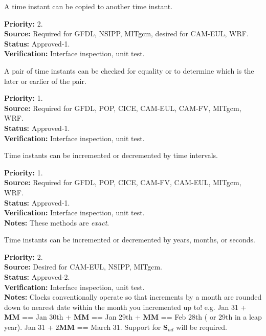A time instant can be copied to another time instant.
\begin{reqlist}
{\bf Priority:} 2. \\
{\bf Source:} Required for GFDL, NSIPP, MITgcm, desired for CAM-EUL, WRF. \\
{\bf Status:} Approved-1. \\
{\bf Verification:} Interface inspection, unit test. 
\end{reqlist}

A pair of time instants can be checked for equality or to determine
which is the later or earlier of the pair.
\begin{reqlist}
{\bf Priority:} 1. \\
{\bf Source:} Required for GFDL, POP, CICE, CAM-EUL, CAM-FV, MITgcm, WRF. \\
{\bf Status:} Approved-1. \\
{\bf Verification:} Interface inspection, unit test. 
\end{reqlist}

Time instants can be incremented or decremented by time intervals.
\begin{reqlist}
{\bf Priority:} 1. \\
{\bf Source:} Required for GFDL, POP, CICE, CAM-FV, CAM-EUL, MITgcm, WRF. \\
{\bf Status:} Approved-1. \\
{\bf Verification:} Interface inspection, unit test. \\
{\bf Notes:} These methods are {\em exact}. 
\end{reqlist}

Time instants can be incremented or decremented by years, months, or seconds.
\begin{reqlist}
{\bf Priority:} 2. \\
{\bf Source:} Desired for CAM-EUL, NSIPP, MITgcm. \\
{\bf Status:} Approved-2. \\
{\bf Verification:} Interface inspection, unit test. \\
{\bf Notes:} Clocks conventionally operate so that increments by a month are
rounded down to nearest date within the month you incremented up to!
e.g. Jan 31 + {\bf MM} == Jan 30th + {\bf MM} ==
Jan 29th + {\bf MM} == Feb 28th ( or 29th in a leap year).
Jan 31 + 2{\bf MM} == March 31. Support for {\bf S}$_{nd}$ will
be required.
\end{reqlist}

